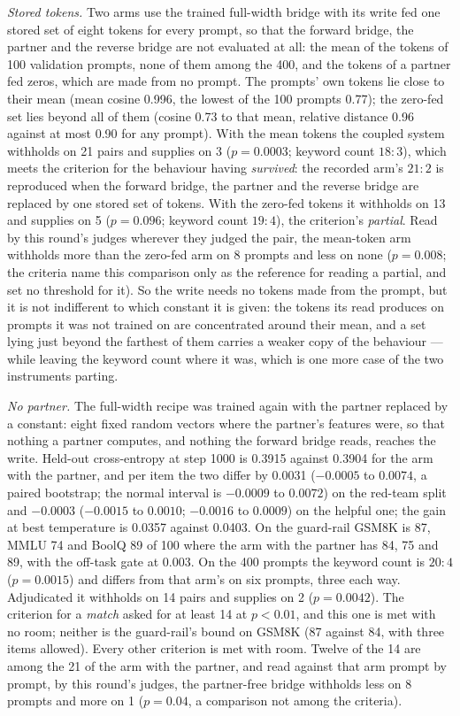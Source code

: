 \documentclass[11pt]{article}
\begin{document}
\emph{Stored tokens.} Two arms use the trained full-width bridge with its write fed
one stored set of eight tokens for every prompt, so that the forward bridge, the
partner and the reverse bridge are not evaluated at all: the mean of the tokens of
100 validation prompts, none of them among the 400, and the tokens of a partner fed
zeros, which are made from no prompt. The prompts' own tokens lie close to their
mean (mean cosine 0.996, the lowest of the 100 prompts 0.77); the zero-fed set lies
beyond all of them (cosine 0.73 to that mean, relative distance 0.96 against at most
0.90 for any prompt). With the
mean tokens the coupled system withholds on 21 pairs and supplies on 3
($p = 0.0003$; keyword count $18{:}3$), which meets the criterion for the behaviour
having \emph{survived}: the recorded arm's $21{:}2$ is reproduced when the forward
bridge, the partner and the reverse bridge are replaced by one stored set of tokens.
With the zero-fed tokens it withholds on 13 and supplies on 5
($p = 0.096$; keyword count $19{:}4$), the criterion's \emph{partial}. Read by this
round's judges wherever they judged the pair, the mean-token arm withholds more
than the zero-fed arm on 8 prompts and less on none ($p = 0.008$; the criteria name
this comparison only as the reference for reading a partial, and set no threshold
for it). So the write needs no tokens made from the prompt, but it is not
indifferent to which constant it is given: the tokens its read produces on prompts
it was not trained on are concentrated around their mean, and a set lying just
beyond the farthest of them carries a weaker copy of the behaviour --- while leaving
the keyword count where it was, which is one more case of the two instruments
parting.

\emph{No partner.} The full-width recipe was trained again with the partner
replaced by a constant: eight fixed random vectors where the partner's features
were, so that nothing a partner computes, and nothing the forward bridge reads,
reaches the write. Held-out cross-entropy at step 1000 is 0.3915 against 0.3904 for
the arm with the partner, and per item the two differ by 0.0031 ($-0.0005$ to
$0.0074$, a paired bootstrap; the normal interval is $-0.0009$ to $0.0072$) on the
red-team split and $-0.0003$ ($-0.0015$ to $0.0010$; $-0.0016$ to $0.0009$) on the
helpful one; the gain at best temperature is 0.0357 against 0.0403. On the
guard-rail GSM8K is 87, MMLU 74 and BoolQ 89 of 100 where the arm with the partner
has 84, 75 and 89, with the off-task gate at 0.003. On the 400 prompts the keyword
count is $20{:}4$ ($p = 0.0015$) and differs from that arm's on six prompts, three
each way. Adjudicated it withholds on 14 pairs and supplies on 2 ($p = 0.0042$).
The criterion for a \emph{match} asked for at least 14 at $p < 0.01$, and this one
is met with no room; neither is the guard-rail's bound on GSM8K (87 against 84,
with three items allowed). Every other criterion is met with room. Twelve of the 14
are among the 21 of the arm with the partner, and read against that arm prompt by
prompt, by this round's judges, the partner-free bridge withholds less on 8 prompts
and more on 1 ($p = 0.04$, a comparison not among the criteria).
\end{document}
